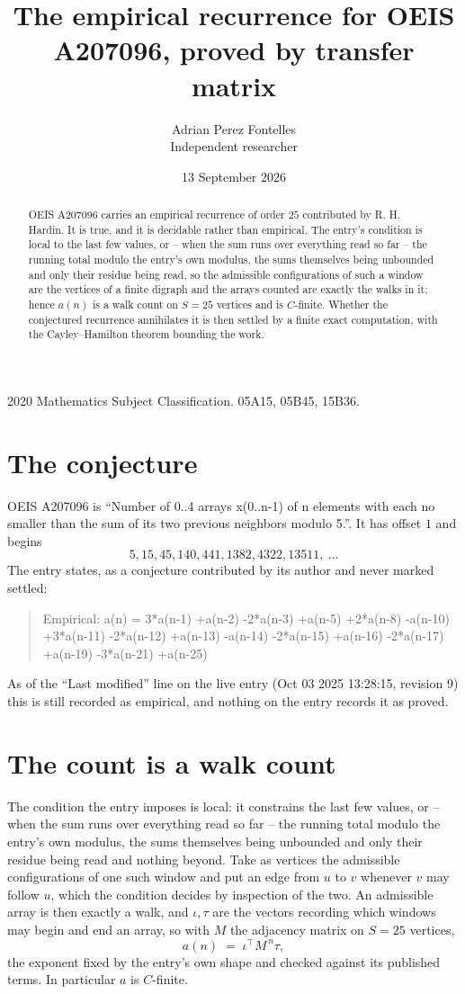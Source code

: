 \documentclass[11pt,a4paper]{article}
\title{The empirical recurrence for OEIS A207096, proved by transfer matrix}
\author{Adrian Perez Fontelles\\ \small Independent researcher}
\date{13 September 2026}
\theoremstyle{plain}
\theoremstyle{definition}
\begin{document}
\maketitle

\begin{abstract}
OEIS A207096 carries an empirical recurrence of order $25$ contributed by R. H. Hardin. It is
true, and it is decidable rather than empirical. The entry's condition is local to the last few values, or -- when the sum runs over everything read so far -- the running total modulo the entry's own modulus, the sums themselves being unbounded and only their residue being read, so
the admissible configurations of such a window are the vertices of a finite digraph and the
arrays counted are exactly the walks in it; hence $a(n)$ is a walk count on $S=25$ vertices
and is $C$-finite. Whether the conjectured recurrence annihilates it is then settled by a
finite exact computation, with the Cayley--Hamilton theorem bounding the work.
\end{abstract}

\noindent\small 2020 Mathematics Subject Classification. 05A15, 05B45, 15B36.\normalsize

\section{The conjecture}

OEIS A207096 is ``Number of 0..4 arrays x(0..n-1) of n elements with each no smaller than the sum of its two previous neighbors modulo 5.''. It has offset $1$ and begins
\[
5, 15, 45, 140, 441, 1382, 4322, 13511,\ \dots
\]
The entry states, as a conjecture contributed by its author and never marked settled:
\begin{quote}
Empirical: a(n) = 3*a(n-1) +a(n-2) -2*a(n-3) +a(n-5) +2*a(n-8) -a(n-10) +3*a(n-11) -2*a(n-12) +a(n-13) -a(n-14) -2*a(n-15) +a(n-16) -2*a(n-17) +a(n-19) -3*a(n-21) +a(n-25)
\end{quote}
As of the ``Last modified'' line on the live entry (Oct 03 2025 13:28:15, revision 9) this is still
recorded as empirical, and nothing on the entry records it as proved.

\section{The count is a walk count}

The condition the entry imposes is local: it constrains the last few values, or -- when the sum runs over everything read so far -- the running total modulo the entry's own modulus, the sums themselves being unbounded and only their residue being read and nothing beyond. Take as vertices the admissible configurations of one such window and put an edge from $u$ to $v$ whenever $v$ may follow $u$, which the condition decides by inspection of the two.
An admissible array is then exactly a walk, and $\iota,\tau$ are the vectors recording which windows may begin and end an array, so with $M$ the adjacency matrix on $S=25$ vertices,
\[
a(n)\;=\;\iota^{\!\top}M^{\,n}\tau ,
\]
the exponent fixed by the entry's own shape and checked against its published terms. In
particular $a$ is $C$-finite.
\end{document}
